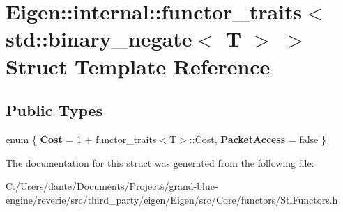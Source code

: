 \hypertarget{struct_eigen_1_1internal_1_1functor__traits_3_01std_1_1binary__negate_3_01_t_01_4_01_4}{}\section{Eigen\+::internal\+::functor\+\_\+traits$<$ std\+::binary\+\_\+negate$<$ T $>$ $>$ Struct Template Reference}
\label{struct_eigen_1_1internal_1_1functor__traits_3_01std_1_1binary__negate_3_01_t_01_4_01_4}
\subsection*{Public Types}
\begin{DoxyCompactItemize}
\item 
\mbox{\label{struct_eigen_1_1internal_1_1functor__traits_3_01std_1_1binary__negate_3_01_t_01_4_01_4_a7c8105f586103897407d5b8ea1d27340}} 
enum \{ {\bfseries Cost} = 1 + functor\+\_\+traits$<$T$>$\+::Cost, 
{\bfseries Packet\+Access} = false
 \}
\end{DoxyCompactItemize}


The documentation for this struct was generated from the following file\+:\begin{DoxyCompactItemize}
\item 
C\+:/\+Users/dante/\+Documents/\+Projects/grand-\/blue-\/engine/reverie/src/third\+\_\+party/eigen/\+Eigen/src/\+Core/functors/Stl\+Functors.\+h\end{DoxyCompactItemize}
